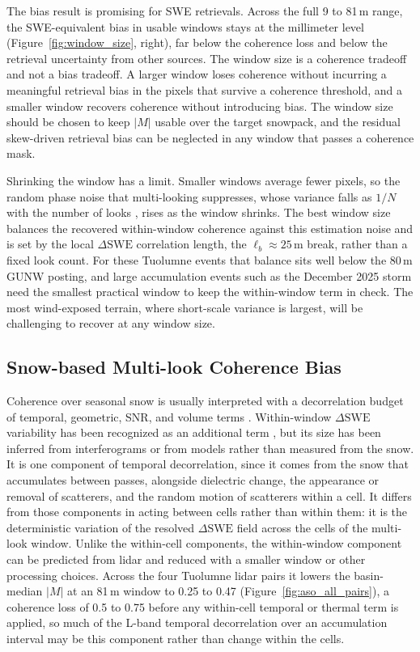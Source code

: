 \documentclass[tc, manuscript]{copernicus}
\begin{document}
The bias result is promising for SWE retrievals. Across the full 9 to 81\,\unit{m} range, the SWE-equivalent bias in usable windows stays at the millimeter level (Figure~\ref{fig:window_size}, right), far below the coherence loss and below the retrieval uncertainty from other sources. The window size is a coherence tradeoff and not a bias tradeoff. A larger window loses coherence without incurring a meaningful retrieval bias in the pixels that survive a coherence threshold, and a smaller window recovers coherence without introducing bias. The window size should be chosen to keep $|M|$ usable over the target snowpack, and the residual skew-driven retrieval bias can be neglected in any window that passes a coherence mask.

Shrinking the window has a limit. Smaller windows average fewer pixels, so the random phase noise that multi-looking suppresses, whose variance falls as $1/N$ with the number of looks \citep{Bamler1998}, rises as the window shrinks. The best window size balances the recovered within-window coherence against this estimation noise and is set by the local $\Delta\mathrm{SWE}$ correlation length, the $\ell_b \approx 25$\,\unit{m} break, rather than a fixed look count. For these Tuolumne events that balance sits well below the 80\,\unit{m} GUNW posting, and large accumulation events such as the December 2025 storm need the smallest practical window to keep the within-window term in check. The most wind-exposed terrain, where short-scale variance is largest, will be challenging to recover at any window size.

\subsection{Snow-based Multi-look Coherence Bias}\label{subsec:coherence-bias}

Coherence over seasonal snow is usually interpreted with a decorrelation budget of temporal, geometric, SNR, and volume terms \citep{Ruiz2021, Oveisgharan2024}. Within-window $\Delta\mathrm{SWE}$ variability has been recognized as an additional term \citep{LiSturm2002, Rott2003, ming2026, yueh2026interferometric-3ba}, but its size has been inferred from interferograms or from models rather than measured from the snow. It is one component of temporal decorrelation, since it comes from the snow that accumulates between passes, alongside dielectric change, the appearance or removal of scatterers, and the random motion of scatterers within a cell. It differs from those components in acting between cells rather than within them: it is the deterministic variation of the resolved $\Delta\mathrm{SWE}$ field across the cells of the multi-look window. Unlike the within-cell components, the within-window component can be predicted from lidar and reduced with a smaller window or other processing choices. Across the four Tuolumne lidar pairs it lowers the basin-median $|M|$ at an 81\,\unit{m} window to 0.25 to 0.47 (Figure~\ref{fig:aso_all_pairs}), a coherence loss of 0.5 to 0.75 before any within-cell temporal or thermal term is applied, so much of the L-band temporal decorrelation over an accumulation interval may be this component rather than change within the cells.
\end{document}
